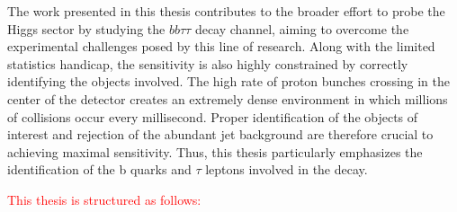 The work presented in this thesis contributes to the broader effort to probe the Higgs sector by studying the $bb\tau\tau$ decay channel, aiming to overcome the experimental challenges posed by this line of research. Along with the limited statistics handicap, the sensitivity is also highly constrained by correctly identifying the objects involved. The high rate of proton bunches crossing in the center of the detector creates an extremely dense environment in which millions of collisions occur every millisecond. Proper identification of the objects of interest and rejection of the abundant jet background are therefore crucial to achieving maximal sensitivity. Thus, this thesis particularly emphasizes the identification of the b quarks and $\tau$ leptons involved in the decay. 

\textcolor{red}{This thesis is structured as follows: }



